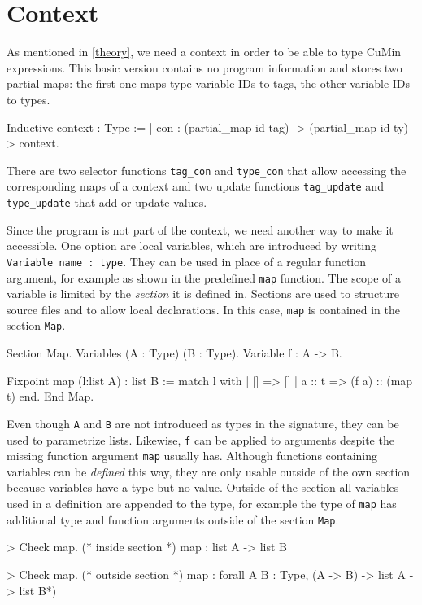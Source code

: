 \documentclass[paper = a4, fleqn, abstract=on, twoside]{scrreprt}
\newcommand{\coqinline}[1]{\texttt{#1}}
\begin{document}
\section{Context}
As mentioned in \autoref{theory}, we need a context in order to be able to type CuMin expressions. This basic version contains no program information and stores two partial maps: the first one maps type variable IDs to tags, the other variable IDs to types. 
\begin{coqcode}
Inductive context : Type := 
  | con : (partial_map id tag) -> (partial_map id ty) -> context.
\end{coqcode}
There are two selector functions \texttt{tag\_con} and \texttt{type\_con} that allow accessing the corresponding maps of a context and two update functions \coqinline{tag_update} and \coqinline{type_update} that add or update values.
\par
Since the program is not part of the context, we need another way to make it accessible. One option are local variables, which are introduced by writing \coqinline{Variable name : type}. They can be used in place of a regular function argument, for example as shown in the predefined \coqinline{map} function. The scope of a variable is limited by the \textit{section} it is defined in. Sections are used to structure source files and to allow local declarations. In this case, \texttt{map} is contained in the section \texttt{Map}.
\begin{coqcode}
Section Map.
  Variables (A : Type) (B : Type).
  Variable f : A -> B.
  
  Fixpoint map (l:list A) : list B :=
    match l with
    | [] => []
    | a :: t => (f a) :: (map t)
    end.
End Map.
\end{coqcode}
Even though \coqinline{A} and \coqinline{B} are not introduced as types in the signature, they can be used to parametrize lists. Likewise, \coqinline{f} can be applied to arguments despite the missing function argument \coqinline{map} usually has. Although functions containing variables can be \textit{defined} this way, they are only usable outside of the own section because variables have a type but no value. Outside of the section all variables used in a definition are appended to the type, for example the type of \texttt{map} has additional type and function arguments outside of the section \texttt{Map}.
\begin{coqcode}
> Check map. (* inside section *)
map : list A -> list B

> Check map. (* outside section *)
map : forall A B : Type, (A -> B) -> list A -> list B*)
\end{coqcode}
\end{document}
